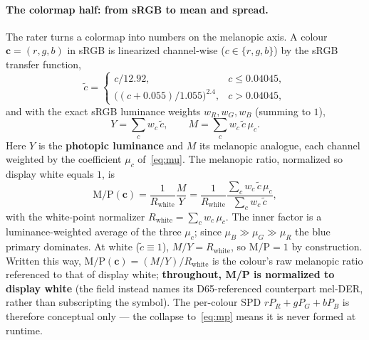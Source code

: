 \documentclass[10pt,a4paper,twocolumn]{article}
\begin{document}
\paragraph{The colormap half: from sRGB to mean and spread.}
The rater turns a colormap into numbers on the melanopic axis.
A colour $\mathbf{c}=(r,g,b)$ in sRGB is linearized channel-wise ($c\in\{r,g,b\}$) by the sRGB transfer function,
\begin{equation}
  \tilde c =
  \begin{cases}
    c/12.92, & c \le 0.04045,\\
    \bigl((c+0.055)/1.055\bigr)^{2.4}, & c > 0.04045, %
  \end{cases}
  \label{eq:eotf}
\end{equation}
and with the exact sRGB luminance weights $w_R,w_G,w_B$ (summing to $1$),
\begin{equation}
  Y = \sum_c w_c\,\tilde c, \qquad M = \sum_c w_c\,\tilde c\,\mu_c .
  \label{eq:YM}
\end{equation}
Here $Y$ is the \textbf{photopic luminance} and $M$ its melanopic analogue, each channel weighted by the coefficient $\mu_c$ of~\eqref{eq:mu}.
The melanopic ratio, normalized so display white equals $1$, is
\begin{equation}
  \mathrm{M/P}(\mathbf{c}) = \frac{1}{R_{\mathrm{white}}}\frac{M}{Y}
    = \frac{1}{R_{\mathrm{white}}}
      \frac{\sum_c w_c\,\tilde c\,\mu_c}{\sum_c w_c\,\tilde c},
  \label{eq:mp}
\end{equation}
with the white-point normalizer $R_{\mathrm{white}} = \sum_c w_c\,\mu_c$.
The inner factor is a luminance-weighted average of the three $\mu_c$; since $\mu_B \gg \mu_G \gg \mu_R$ the blue primary dominates.
At white ($\tilde c\equiv 1$), $M/Y = R_{\mathrm{white}}$, so $\mathrm{M/P}=1$ by construction.
Written this way, $\mathrm{M/P}(\mathbf c)=(M/Y)/R_{\mathrm{white}}$ is the colour's raw melanopic ratio referenced to that of display white; \textbf{throughout, M/P is normalized to display white} (the field instead names its D65-referenced counterpart mel-DER, rather than subscripting the symbol).
The per-colour SPD $rP_R+gP_G+bP_B$ is therefore conceptual only --- the collapse to~\eqref{eq:mp} means it is never formed at runtime.
\end{document}
